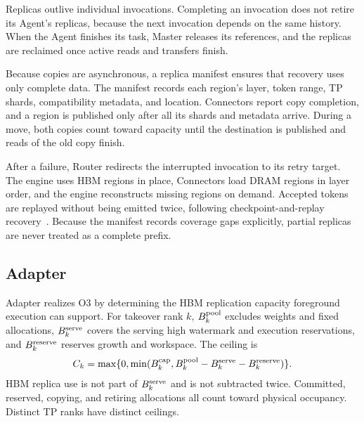 Replicas outlive individual invocations. Completing an invocation does
not retire its Agent's replicas, because the next invocation depends on
the same history. When the Agent finishes its task, Master releases its
references, and the replicas are reclaimed once active reads and
transfers finish.

Because copies are asynchronous, a replica manifest ensures that
recovery uses only complete data. The manifest records each region's
layer, token range, TP shards, compatibility metadata, and location.
Connectors report copy completion, and a region is published only after
all its shards and metadata arrive. During a move, both copies count
toward capacity until the destination is published and reads of the old
copy finish.

After a failure, Router redirects the interrupted invocation to its
retry target. The engine uses HBM regions in place, Connectors load DRAM
regions in layer order, and the engine reconstructs missing regions on
demand. Accepted tokens are replayed without being emitted twice,
following checkpoint-and-replay recovery~\cite{strati2024dejavu,cao2026lumen}.
Because the manifest records coverage gaps explicitly, partial replicas
are never treated as a complete prefix.

\subsection{Adapter}
\label{sec:capacity}

Adapter realizes O3 by determining the HBM replication capacity
foreground execution can support. For takeover rank $k$,
$B^{\rm pool}_k$ excludes weights and fixed allocations,
$B^{\rm serve}_k$ covers the serving high watermark and execution
reservations, and $B^{\rm reserve}_k$ reserves growth and workspace.
The ceiling is
\begin{equation}
 C_k=\max\{0,\min(B^{\rm cap}_k,
 B^{\rm pool}_k-B^{\rm serve}_k-B^{\rm reserve}_k)\}.
 \label{eq:ceiling}
\end{equation}
HBM replica use is not part of $B^{\rm serve}_k$ and is not subtracted twice.
Committed, reserved, copying, and retiring allocations all count toward
physical occupancy. Distinct TP ranks have distinct ceilings.

